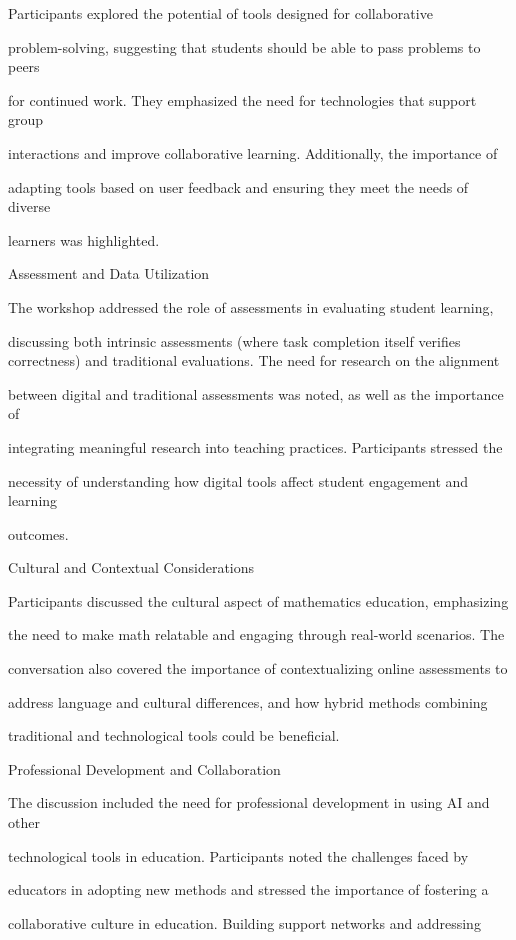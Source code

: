\documentclass[11pt]{article}
\begin{document}
Participants explored the potential of tools designed for collaborative

problem-solving, suggesting that students should be able to pass problems to peers

for continued work. They emphasized the need for technologies that support group

interactions and improve collaborative learning. Additionally, the importance of

adapting tools based on user feedback and ensuring they meet the needs of diverse

learners was highlighted.

Assessment and Data Utilization

The workshop addressed the role of assessments in evaluating student learning,

discussing both intrinsic assessments (where task completion itself verifies correctness) and traditional evaluations. The need for research on the alignment

between digital and traditional assessments was noted, as well as the importance of

integrating meaningful research into teaching practices. Participants stressed the

necessity of understanding how digital tools affect student engagement and learning

outcomes.

Cultural and Contextual Considerations

Participants discussed the cultural aspect of mathematics education, emphasizing

the need to make math relatable and engaging through real-world scenarios. The

conversation also covered the importance of contextualizing online assessments to

address language and cultural differences, and how hybrid methods combining

traditional and technological tools could be beneficial.

Professional Development and Collaboration

The discussion included the need for professional development in using AI and other

technological tools in education. Participants noted the challenges faced by

educators in adopting new methods and stressed the importance of fostering a

collaborative culture in education. Building support networks and addressing
\end{document}
